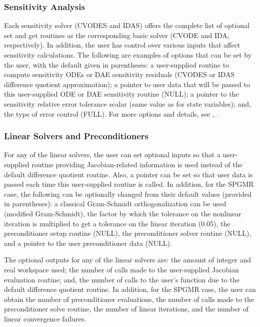 \subsubsection*{Sensitivity Analysis}

Each sensitivity solver (CVODES and IDAS) offers the complete list of
optional set and get routines as the corresponding basic solver (CVODE
and IDA, respectively). In addition, the user has control over various
inputs that affect sensitivity calculations. 
The following are examples of options that can be set by the user,
with the default given in parentheses: a user-supplied routine
to compute sensitivity ODEs or DAE sensitivity residuals (CVODES or
IDAS difference quotient approximation); a pointer to user data that
will be passed to this user-supplied ODE or DAE sensitivity routine (NULL); a
pointer to the sensitivity relative error tolerance scalar (same value as
for state variables); and, the type of error control (FULL).
For more options and details, see \cite{SeHi:03}, \cite{HiSe:02}.

\subsubsection*{Linear Solvers and Preconditioners}

For any of the linear solvers, the user can set optional inputs so 
that a user-supplied routine providing Jacobian-related information
is used instead of the default difference quotient routine. 
Also, a pointer can be set so that user data is passed each time this
user-supplied routine is called. In addition, for the SPGMR case,
the following can be optionally changed from their default values
(provided in parentheses): a classical Gram-Schmidt orthogonalization 
can be used (modified Gram-Schmidt), the factor by which the tolerance on the
nonlinear iteration is multiplied to get a tolerance on the linear
iteration (0.05), the preconditioner setup routine (NULL), the
preconditioner solver routine (NULL), and a pointer to the user
preconditioner data (NULL).

The optional outputs for any of the linear solvers are: the amount of 
integer and real workspace used; the number of calls made to the user-supplied 
Jacobian evaluation routine; and, the number of calls to the user's function 
due to the default difference quotient routine.
In addition, for the SPGMR case, the user can obtain the number of preconditioner
evaluations, the number of calls made to the preconditioner solve
routine, the number of linear iterations, and the number of linear
convergence failures.

